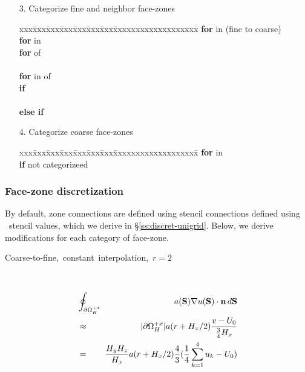 \documentclass[10pt]{article}
\begin{document}
\begin{itemize}
\item[3.] Categorize fine and neighbor face-zones
\begin{tabbing}
xxx\=xxx\=xxx\=xxx\=xxx\=xxx\=xxx\=xxxxxxxxxxxxxxxxxxx\=\kill
\> \textbf{for}  in  (fine to coarse) \\
\>\> \textbf{for}  in  \\
\>\>\> \textbf{for}  of  \\
\>\>\>\>  \\
\>\>\>\> \textbf{for}  in  of \\
\>\>\>\>\> \textbf{if}  \\
\>\>\>\>\>\>  \\
\>\>\>\>\> \textbf{else if}  \\
\>\>\>\>\>\> 
\end{tabbing}
\item[4.] Categorize coarse face-zones
\begin{tabbing}
xxx\=xxx\=xxx\=xxx\=xxx\=xxx\=xxx\=xxxxxxxxxxxxxxxxxxx\=\kill
\> \textbf{for}  in  \\
\>\> \textbf{if}  not categorizeed \\
\>\>\>        
\end{tabbing}
\end{itemize}


\subsubsection{Face-zone discretization}

By default, zone connections are defined using stencil connections defined
using \hypre\ stencil values, which we derive in \S\ref{ss:discret-unigrid}.
Below, we derive modifications for each category of face-zone.


\begin{minipage}{1.75in}
\mbox{Coarse-to-fine, constant interpolation, $r=2$} \\
\end{minipage} \ \ \ \ 
\begin{minipage}{4.00in}
\begin{eqnarray*}
& \oint_{\partial\Omega_H^{+x}}  \!\!\! & a(\textbf{S}) \nabla u(\textbf{S})\cdot \textbf{n} \, d\textbf{S}  \\
& \approx & |\partial\Omega_H^{+x}| a(r+H_x/2) \frac{v - U_0}{\frac{3}{4}H_x} \\
& = & \frac{H_yH_z}{H_x} a(r+H_x/2) \frac{4}{3} (\frac{1}{4} \sum_{k=1}^4 u_k - U_0)   \\
\end{eqnarray*}
\end{minipage}
\end{document}

